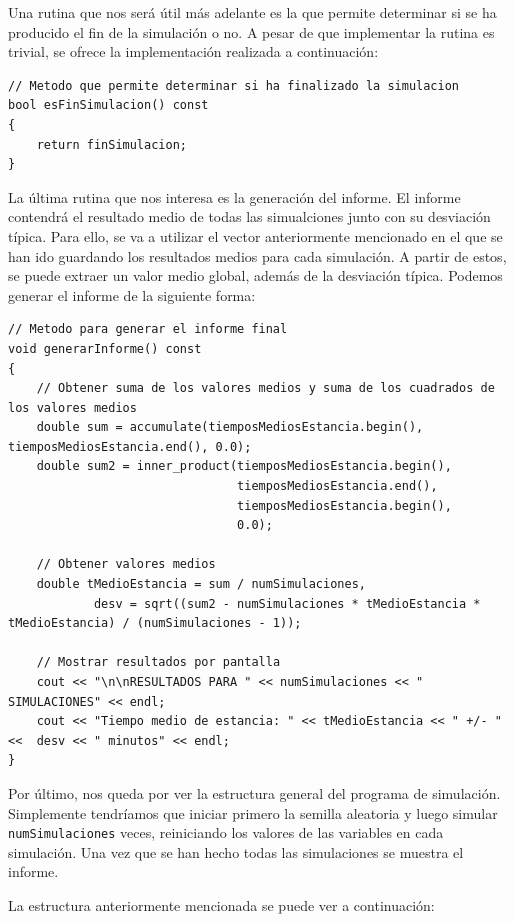 \documentclass[11pt,a4paper]{article}
\begin{document}
Una rutina que nos será útil más adelante es la que permite determinar si se ha producido
el fin de la simulación o no. A pesar de que implementar la rutina es trivial, se ofrece la
implementación realizada a continuación:

\begin{lstlisting}
// Metodo que permite determinar si ha finalizado la simulacion
bool esFinSimulacion() const
{
	return finSimulacion;
}
\end{lstlisting}

La última rutina que nos interesa es la generación del informe. El informe contendrá el resultado
medio de todas las simualciones junto con su desviación típica. Para ello, se va a utilizar el vector
anteriormente mencionado en el que se han ido guardando los resultados medios para cada simulación.
A partir de estos, se puede extraer un valor medio global, además de la desviación típica. Podemos
generar el informe de la siguiente forma:

\begin{lstlisting}
// Metodo para generar el informe final
void generarInforme() const
{
	// Obtener suma de los valores medios y suma de los cuadrados de los valores medios
    double sum = accumulate(tiemposMediosEstancia.begin(), tiemposMediosEstancia.end(), 0.0);
    double sum2 = inner_product(tiemposMediosEstancia.begin(),
                                tiemposMediosEstancia.end(),
                                tiemposMediosEstancia.begin(),
                                0.0);
            
    // Obtener valores medios
    double tMedioEstancia = sum / numSimulaciones,
    	    desv = sqrt((sum2 - numSimulaciones * tMedioEstancia * tMedioEstancia) / (numSimulaciones - 1));
            
	// Mostrar resultados por pantalla
    cout << "\n\nRESULTADOS PARA " << numSimulaciones << " SIMULACIONES" << endl;
    cout << "Tiempo medio de estancia: " << tMedioEstancia << " +/- " <<  desv << " minutos" << endl;             
}
\end{lstlisting}

Por último, nos queda por ver la estructura general del programa de simulación. Simplemente
tendríamos que iniciar primero la semilla aleatoria y luego simular \texttt{numSimulaciones}
veces, reiniciando los valores de las variables en cada simulación. Una vez que se han hecho
todas las simulaciones se muestra el informe.

La estructura anteriormente mencionada se puede ver a continuación:
\end{document}
